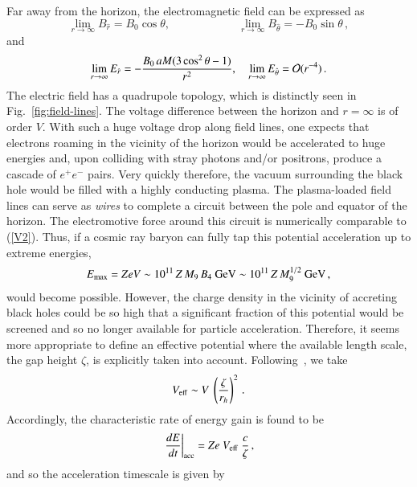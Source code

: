 \documentclass[aps,prd,twocolumn,superscriptaddress,tightenlines,nofootinbib]{revtex4-1}
\begin{document}
Far away from the horizon, the electromagnetic field can be expressed as~\cite{Wald:1974np}
\begin{equation}
\lim_{r \to \infty} B_{\hat r}  = B_0 \cos \theta, \quad \quad \quad
\quad \quad \quad 
\lim_{r \to \infty}  B_{\hat \theta}  = - B_0 \sin \theta \,, 
\end{equation}
and
\begin{equation}
\lim_{r \to \infty} E_{\hat r}  = - \frac{B_0 \, a M (3 \cos^2 \theta -
  1)}{r^2}, \quad 
\lim_{r \to \infty}  E_{\hat \theta}  = {\cal O} (r^{-4}) \, .
\end{equation} 
The electric field has a quadrupole topology, which is distinctly seen 
in Fig.~\ref{fig:field-lines}.  The voltage difference between the horizon and
$r = \infty$ is of order $V$. With such a huge voltage drop along
field lines, one expects that electrons roaming in the vicinity of
the horizon would be accelerated to huge energies and, upon colliding
with stray photons and/or positrons, produce a cascade of
$e^+e^-$ pairs. Very quickly therefore, the vacuum surrounding the
black hole would be filled with a highly conducting plasma. The
plasma-loaded field lines can serve as {\it wires} to complete a
circuit between the pole and equator of the horizon. The electromotive
force around this circuit is numerically comparable to
(\ref{V2}). Thus, if
a cosmic ray baryon can fully tap this potential acceleration up to
extreme energies,
\begin{equation}
E_{\rm max} = Ze V \sim 10^{11} \, Z \, M_9  \, B_4~{\rm  GeV} \sim
10^{11} \, Z\, M_9^{1/2}~{\rm GeV}\,,
\label{maxE}
\end{equation}
would become possible. However, the charge density in the vicinity of
accreting black holes could be so high that a significant fraction of
this potential would be screened and so no longer available for
particle acceleration. Therefore, it seems more appropriate to define
an effective potential where the available length scale, the gap
height $\zeta$, is explicitly taken into
account. Following~\cite{Rieger:2011ch}, we take 
\begin{equation}
V_{\rm eff} \sim V \ \left(\frac{\zeta}{r_h} \right)^2 \, .
\end{equation}
Accordingly, the characteristic rate of energy gain is found to be
\begin{equation}
\left. \frac{dE}{dt} \right|_{\rm acc} = Z e \ V_{\rm eff} \ \frac{c}{\zeta} \,,
\end{equation}
and so the acceleration timescale is given by
\end{document}

